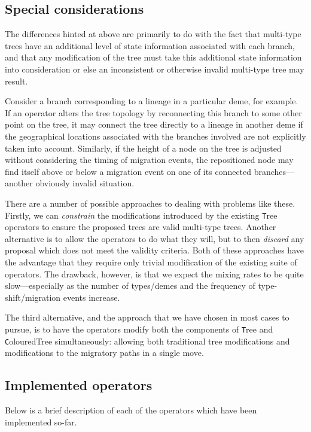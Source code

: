\documentclass[a4paper,11pt]{article}
\newcommand{\class}[1]{{\texttt #1}}
\begin{document}
\subsection{Special considerations}

The differences hinted at above are primarily to do with the fact that
multi-type trees have an additional level of state information
associated with each branch, and that any modification of the tree
must take this additional state information into consideration or else
an inconsistent or otherwise invalid multi-type tree may result.

Consider a branch corresponding to a lineage in a particular deme, for
example. If an operator alters the tree topology by reconnecting this
branch to some other point on the tree, it may connect the tree
directly to a lineage in another deme if the geographical locations
associated with the branches involved are not explicitly taken into
account.  Similarly, if the height of a node on the tree is adjusted
without considering the timing of migration events, the repositioned
node may find itself above or below a migration event on one of its
connected branches---another obviously invalid situation.

There are a number of possible approaches to dealing with problems
like these.  Firstly, we can \emph{constrain} the modifications
introduced by the existing \class{Tree} operators to ensure the
proposed trees are valid multi-type trees.  Another alternative is to
allow the operators to do what they will, but to then \emph{discard}
any proposal which does not meet the validity criteria. Both of these
approaches have the advantage that they require only trivial
modification of the existing suite of operators.  The drawback,
however, is that we expect the mixing rates to be quite
slow---especially as the number of types/demes and the frequency of
type-shift/migration events increase.

The third alternative, and the approach that we have chosen in most
cases to pursue, is to have the operators modify both the components
of \class{Tree} and \class{ColouredTree} simultaneously: allowing both
traditional tree modifications and modifications to the migratory
paths in a single move.

\subsection{Implemented operators}

Below is a brief description of each of the operators which have been
implemented so-far.
\end{document}
